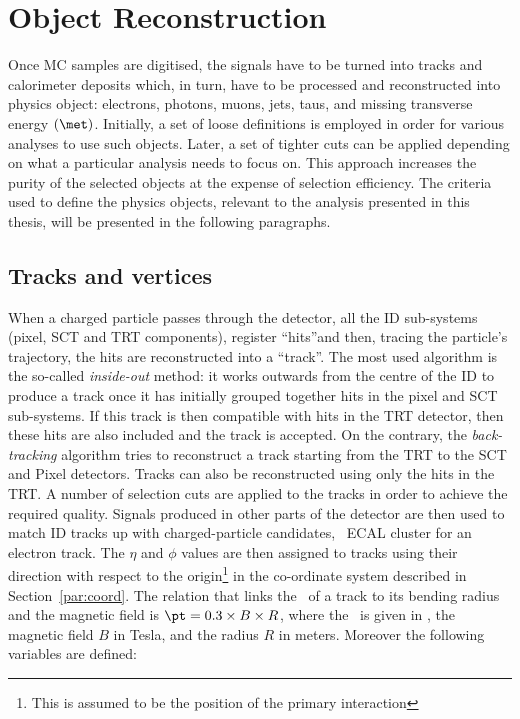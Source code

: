 	\section{Object Reconstruction}
	\label{sec:objReco}

		Once \ac{MC} samples are digitised, the signals have to be turned into tracks and calorimeter deposits which, in turn, have to be processed and reconstructed into physics object: electrons, photons, muons, jets, taus, and missing transverse energy $\left ( \met \right )$. Initially, a set of loose definitions is employed in order for various analyses to use such objects. Later, a set of tighter cuts can be applied depending on what a particular analysis needs to focus on. This approach increases the purity of the selected objects at the expense of selection efficiency. The criteria used to define the physics objects, relevant to the analysis presented in this thesis, will be presented in the following paragraphs.


		\subsection*{Tracks and vertices}

			When a charged particle passes through the detector, all the \ac{ID} sub-systems (pixel, \ac{SCT} and \ac{TRT} components), register ``hits''and then, tracing the particle's trajectory, the hits are reconstructed into a ``track''. The most used algorithm is the so-called \emph{inside-out} method: it works outwards from the centre of the \ac{ID} to produce a track once it has initially grouped together hits in the pixel and \ac{SCT} sub-systems. If this track is then compatible with hits in the \ac{TRT} detector, then these hits are also included and the track is accepted. On the contrary, the \emph{back-tracking} algorithm tries to reconstruct a track starting from the \ac{TRT} to the \ac{SCT} and Pixel detectors. Tracks can also be reconstructed using only the hits in the \ac{TRT}. A number of selection cuts are applied to the tracks in order to achieve the required quality. Signals produced in other parts of the detector are then used to match \ac{ID} tracks up with charged-particle candidates, \eg\ \ac{ECAL} cluster for an electron track. The $\eta$ and $\phi$ values are then assigned to tracks using their direction with respect to the origin\footnote{This is assumed to be the position of the primary interaction} in the co-ordinate system described in Section~\ref{par:coord}. The relation that links the \pt\ of a track to its bending radius and the magnetic field is $\pt = 0.3 \times B \times R$, where the \pt\ is given in \GeV, the magnetic field $B$ in Tesla, and the radius $R$ in meters. Moreover the following variables are defined:

